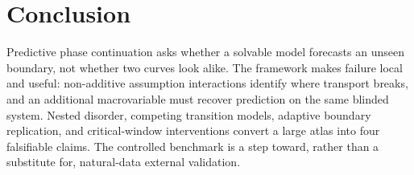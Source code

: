 \section{Conclusion}

Predictive phase continuation asks whether a solvable model forecasts an
unseen boundary, not whether two curves look alike.  The framework makes
failure local and useful: non-additive assumption interactions identify where
transport breaks, and an additional macrovariable must recover prediction on
the same blinded system.  Nested disorder, competing transition models,
adaptive boundary replication, and critical-window interventions convert a
large atlas into four falsifiable claims.  The controlled benchmark is a step
toward, rather than a substitute for, natural-data external validation.
